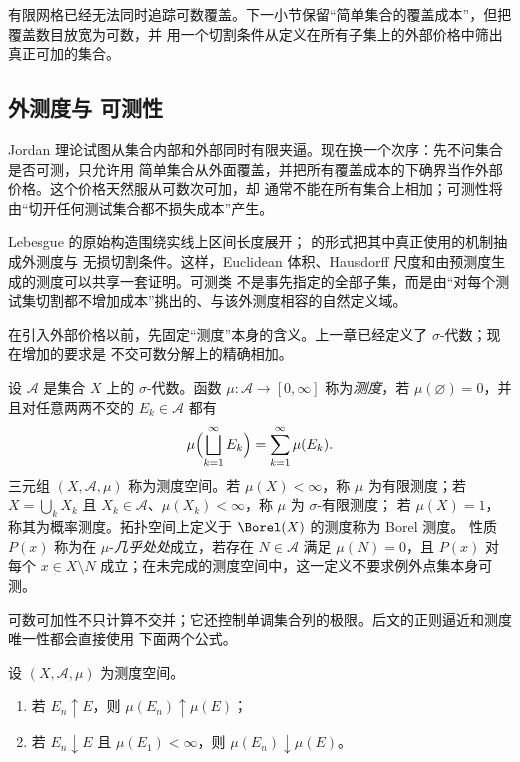 有限网格已经无法同时追踪可数覆盖。下一小节保留“简单集合的覆盖成本”，但把覆盖数目放宽为可数，并
用一个切割条件从定义在所有子集上的外部价格中筛出真正可加的集合。

\subsection{外测度与 \Caratheodory{} 可测性}\label{subsec:2-1-2}

Jordan 理论试图从集合内部和外部同时有限夹逼。现在换一个次序：先不问集合是否可测，只允许用
简单集合从外面覆盖，并把所有覆盖成本的下确界当作外部价格。这个价格天然服从可数次可加，却
通常不能在所有集合上相加；可测性将由“切开任何测试集合都不损失成本”产生。

Lebesgue 的原始构造围绕实线上区间长度展开；\Caratheodory{} 的形式把其中真正使用的机制抽成外测度与
无损切割条件。这样，Euclidean 体积、Hausdorff 尺度和由预测度生成的测度可以共享一套证明。可测类
不是事先指定的全部子集，而是由“对每个测试集切割都不增加成本”挑出的、与该外测度相容的自然定义域。

在引入外部价格以前，先固定“测度”本身的含义。上一章已经定义了 $\sigma$-代数；现在增加的要求是
不交可数分解上的精确相加。

\begin{definition}[测度与测度空间]\label{def:2-1-2-measure-space}
设 $\mathcal A$ 是集合 $X$ 上的 $\sigma$-代数。函数
$\mu:\mathcal A\to[0,\infty]$ 称为\emph{测度}，若 $\mu(\varnothing)=0$，并且对任意两两不交的
$E_k\in\mathcal A$ 都有
\[
 \mu\Bigl(\bigsqcup_{k=1}^{\infty}E_k\Bigr)
 =\sum_{k=1}^{\infty}\mu(E_k).
\]
三元组 $(X,\mathcal A,\mu)$ 称为测度空间。若 $\mu(X)<\infty$，称 $\mu$ 为有限测度；若
$X=\bigcup_kX_k$ 且 $X_k\in\mathcal A$、$\mu(X_k)<\infty$，称 $\mu$ 为 $\sigma$-有限测度；
若 $\mu(X)=1$，称其为概率测度。拓扑空间上定义于 $\Borel(X)$ 的测度称为 Borel 测度。
性质 $P(x)$ 称为在 $\mu$-\emph{几乎处处}成立，若存在 $N\in\mathcal A$ 满足 $\mu(N)=0$，且
$P(x)$ 对每个 $x\in X\setminus N$ 成立；在未完成的测度空间中，这一定义不要求例外点集本身可测。
\end{definition}

可数可加性不只计算不交并；它还控制单调集合列的极限。后文的正则逼近和测度唯一性都会直接使用
下面两个公式。

\begin{proposition}[测度的单调连续性]\label{proposition:2-1-2-measure-continuity}
设 $(X,\mathcal A,\mu)$ 为测度空间。
\begin{enumerate}
 \item 若 $E_n\uparrow E$，则 $\mu(E_n)\uparrow\mu(E)$；
 \item 若 $E_n\downarrow E$ 且 $\mu(E_1)<\infty$，则 $\mu(E_n)\downarrow\mu(E)$。
\end{enumerate}
\end{proposition}

